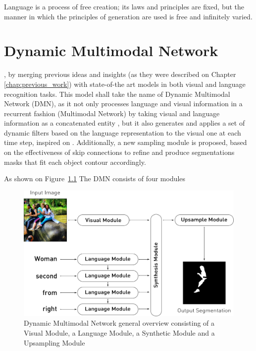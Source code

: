 \begin{savequote}[75mm]
Language is a process of free creation; its laws and principles are fixed, but the manner in which the principles of generation are used is free and infinitely varied.
\end{savequote}

\chapter{Dynamic Multimodal Network}

, by merging previous ideas and insights (as they were described on Chapter \ref{chap:previous_work}) with state-of-the art models in both visual and language recognition tasks. This model shall take the name of Dynamic Multimodal Network (DMN), as it not only processes language and visual information in a recurrent fashion \cite{li2017cvpr} (Multimodal Network) by taking visual and language information as a concatenated entity \cite{hu2016segmentation}, but it also generates and applies a set of dynamic filters based on the language representation to the visual one at each time step, inspired on \cite{liu2017segmentation}. Additionally, a new sampling module is proposed, based on the effectiveness of skip connections \cite{DBLP:journals/corr/RonnebergerFB15} to refine and produce segmentations masks that fit each object contour accordingly.

As shown on Figure~\ref{Fig:Overall} The DMN consists of four modules

\begin{figure}
\centering
\includegraphics[width=\textwidth]{./figures/Model_Overview.pdf}
\caption{Dynamic Multimodal Network general overview consisting of a Visual Module, a Language Module, a Synthetic Module and a Upsampling Module}
\label{Fig:Overall}
\end{figure}
